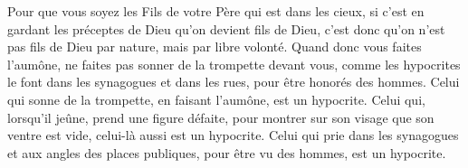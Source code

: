 Pour que vous soyez les Fils de votre Père qui est dans les cieux,
	si c’est en gardant les préceptes de Dieu qu’on devient fils de Dieu,
	c’est donc qu’on n’est pas fils de Dieu par nature, mais par libre volonté.
Quand donc vous faites l’aumône,
	ne faites pas sonner de la trompette devant vous,
	comme les hypocrites le font dans les synagogues et dans les rues,
	pour être honorés des hommes.
Celui qui sonne de la trompette, en faisant l’aumône, est un hypocrite.
Celui qui, lorsqu’il jeûne, prend une figure défaite,
	pour montrer sur son visage que son ventre est vide,
	celui-là aussi est un hypocrite.
Celui qui prie dans les synagogues et aux angles des places publiques,
		pour être vu des hommes,
	est un hypocrite.
